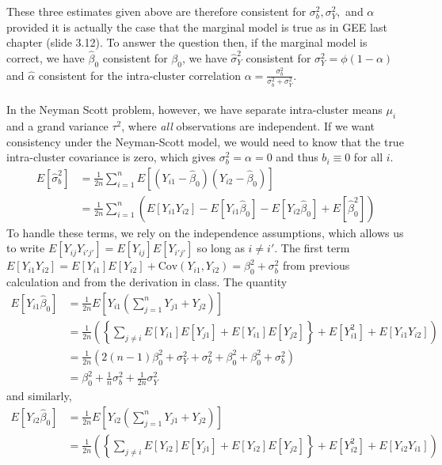 \documentclass[11pt]{article}
\newcommand{\Cov}{\mathrm{Cov}}
\begin{document}
\begin{enumerate}
	These three estimates given above are therefore consistent for $\sigma^2_b, \sigma^2_Y, $ and $\alpha$ provided it is actually the case that the marginal model is true as in GEE last chapter (slide 3.12). To answer the question then, if the marginal model is correct, we have $\widehat{\beta}_0$ consistent for $\beta_0$, we have $\widehat{\sigma}_Y^2$ consistent for $\sigma^2_Y = \phi(1-\alpha)$ and $\widehat{\alpha}$ consistent for the intra-cluster correlation $\alpha = \frac{\sigma^2_b}{\sigma^2_b + \sigma^2_Y}$.
	\\ \\ In the Neyman Scott problem, however, we have separate intra-cluster means $\mu_i$ and a grand variance $\tau^2$, where \emph{all} observations are independent. If we want consistency under the Neyman-Scott model, we would need to know that the true intra-cluster covariance is zero, which gives $\sigma^2_b = \alpha = 0$ and thus $b_i \equiv 0$ for all $i$.
\newpage
	\begin{align*}
		E[\widehat{\sigma}_b^2] &= \frac{1}{2n}\sum_{i=1}^n E[(Y_{i1}-\widehat{\beta}_0)(Y_{i2}-\widehat{\beta}_0)] \\
		&= \frac{1}{2n}\sum_{i=1}^n (E[Y_{i1}Y_{i2}]-E[Y_{i1}\widehat{\beta}_0]-E[Y_{i2}\widehat{\beta}_0] + E[\widehat{\beta}_0^2])
	\end{align*}
	To handle these terms, we rely on the independence assumptions, which allows us to write $E[Y_{ij}Y_{i'j'}] = E[Y_{ij}]E[Y_{i'j'}]$ so long as $i\neq i'$. The first term $E[Y_{i1}Y_{i2}] = E[Y_{i1}]E[Y_{i2}] + \Cov(Y_{i1},Y_{i2}) = \beta_0^2 + \sigma^2_b$ from previous calculation and from the derivation in class. The quantity
	\begin{align*}
		E[Y_{i1}\widehat{\beta}_0] &= \frac{1}{2n}E\left[Y_{i1}\left(\sum_{j=1}^n Y_{j1}+Y_{j2} \right)\right] \\
		&= \frac{1}{2n}\left(\left\{\sum_{j\neq i} E[Y_{i1}]E[Y_{j1}] + E[Y_{i1}]E[Y_{j2}]\right\} + E[Y_{i1}^2] + E[Y_{i1}Y_{i2}]\right) \\
		&= \frac{1}{2n}(2(n-1)\beta_0^2 + \sigma^2_Y + \sigma^2_b + \beta_0^2 + \beta_0^2 + \sigma^2_b) \\
		&= \beta_0^2 + \frac{1}{n} \sigma^2_b + \frac{1}{2n}\sigma^2_Y
	\end{align*}
	and similarly,
	\begin{align*}
		E[Y_{i2}\widehat{\beta}_0] &= \frac{1}{2n}E\left[Y_{i2}\left(\sum_{j=1}^n Y_{j1}+Y_{j2} \right)\right] \\
		&= \frac{1}{2n}\left(\left\{\sum_{j\neq i} E[Y_{i2}]E[Y_{j1}] + E[Y_{i2}]E[Y_{j2}]\right\} + E[Y_{i2}^2] + E[Y_{i2}Y_{i1}]\right) \\

\end{align*}
\end{enumerate}
\end{document}
